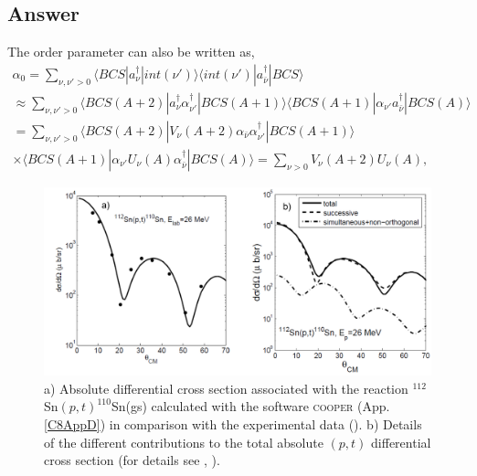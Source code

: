 \subsection*{Answer}
The order parameter can also be written as,
\begin{multline}
\alpha_0=\sum_{\nu,\nu'>0}\langle BCS |a^\dagger_{\nu}|int(\nu')\rangle\langle int(\nu')|a^\dagger_{\bar\nu}|BCS\rangle\\
\approx\sum_{\nu,\nu'>0}\langle BCS (A+2) |a^\dagger_{\nu}\alpha^\dagger_{\nu'}|BCS (A+1)\rangle\langle BCS (A+1)|\alpha_{\nu'}a^\dagger_{\bar\nu}|BCS (A)\rangle \\
=\sum_{\nu,\nu'>0}\langle BCS(A+2) |V_\nu(A+2)\alpha_{\bar\nu}\alpha^\dagger_{\nu'}|BCS(A+1)\rangle\\
\times\langle BCS(A+1)|\alpha_{\nu'}U_\nu(A)\alpha^\dagger_{\bar\nu}|BCS(A)\rangle
=\sum_{\nu>0}V_\nu(A+2)U_{\nu}(A),
\end{multline}
\begin{figure}
\centerline{\includegraphics*[width=\textwidth,angle=0]{nutshell/figs/fig2A2.pdf}}
\caption{a) Absolute differential cross section associated with the reaction $^{112}$Sn$(p,t)^{110}$Sn(gs) calculated with the software \textsc{cooper} (App. \ref{C8AppD}) in comparison with the experimental data (\cite{Guazzoni:06}). b) Details of the different contributions to the total absolute $(p,t)$ differential cross section (for details see \cite{Potel:13}, \cite{Potel:13b}).}\label{fig_2A2}
\end{figure}
